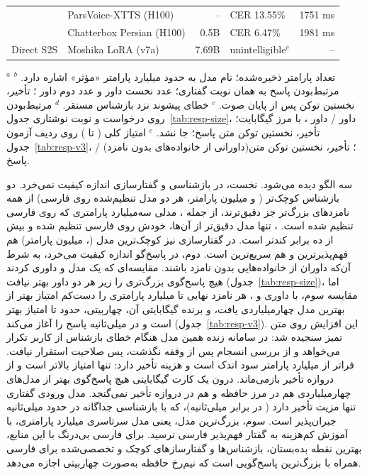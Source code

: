 \begin{table}[ht]
\begin{latin}
\begin{tabular}{llrlr}
 & ParsVoice-XTTS (H100) & -- & CER 13.55\% & 1751 ms \\
 & Chatterbox Persian (H100) & 0.5B & CER 6.47\% & 1981 ms \\
\midrule
Direct S2S & Moshika LoRA (v7a) & 7.69B & unintelligible$^{c}$ & -- \\
\bottomrule
\end{tabular}
\end{latin}
\par\smallskip\footnotesize
$^{a}$ تعداد پارامتر ذخیره‌شده؛ نام مدل به حدود  میلیارد پارامتر «مؤثر» اشاره دارد.
$^{b}$ مرتبط‌بودن پاسخ به همان  نوبت گفتاری؛ عدد نخست داور  و عدد دوم داور ؛ تأخیر، نخستین توکن پس از پایان صوت.
$^{c}$ خطای پیشوند  نزد بازشناس مستقر.
$^{d}$ مرتبط‌بودن روی  درخواست و نوبت نوشتاری جدول~\ref{tab:resp-size}، داور
 / داور ، با مرز  گیگابایت؛ تأخیر، نخستین توکن متن پاسخ؛
 جا نشد.
$^{e}$ امتیاز کلی ( تا ) روی  ردیف آزمون جدول~\ref{tab:resp-v3}،
 /  (داورانی از خانواده‌های بدون نامزد)؛ تأخیر، نخستین توکن متن پاسخ.
\end{table}

سه الگو دیده می‌شود. نخست، در بازشناسی و گفتارسازی اندازه کیفیت نمی‌خرد. دو بازشناس کوچک‌تر
( و  میلیون پارامتر، هر دو مدل  تنظیم‌شده روی فارسی) از همه
نامزدهای بزرگ‌تر جز  دقیق‌ترند، از جمله ، مدلی سه‌میلیارد
پارامتری که روی فارسی تنظیم شده است. ، تنها مدل دقیق‌تر از آن‌ها،
خودش روی فارسی تنظیم شده و بیش از ده برابر کندتر است. در گفتارسازی نیز کوچک‌ترین
مدل (،  میلیون پارامتر) هم فهم‌پذیرترین و هم سریع‌ترین است.
دوم، در پاسخ‌گو اندازه کیفیت می‌خرد، به شرط آن‌که داوران از خانواده‌هایی بدون نامزد
باشند. مقایسه‌ای که یک مدل  و  داوری کردند هیچ پاسخ‌گوی بزرگ‌تری
را زیر هر دو داور بهتر نیافت (جدول~\ref{tab:resp-size})، اما مقایسه سوم، با داوری
 و ، هر نامزد نهایی  تا  میلیارد پارامتری را
دست‌کم  امتیاز بهتر از بهترین مدل چهارمیلیاردی یافت، و برنده 
گیگابایتی آن،  چهاربیتی، حدود  تا  امتیاز بهتر است و
در  میلی‌ثانیه پاسخ را آغاز می‌کند (جدول~\ref{tab:resp-v3}). این افزایش روی
متن تمیز سنجیده شد: در سامانه زنده همین مدل هنگام خطای بازشناس از کاربر تکرار
می‌خواهد و از بررسی انسجام پس از وقفه نگذشت، پس صلاحیت استقرار نیافت. فراتر از 
میلیارد پارامتر سود اندک است و هزینه تأخیر دارد:  تنها 
امتیاز بالاتر است و از دروازه تأخیر بازمی‌ماند. درون یک کارت  گیگابایتی هیچ
پاسخ‌گوی بهتر از مدل‌های چهارمیلیاردی هم در مرز حافظه و هم در دروازه تأخیر نمی‌گنجد.
مدل ورودی گفتاری تنها مزیت تأخیر
دارد ( در برابر  میلی‌ثانیه)، که با بازشناسی جداگانه در حدود
 میلی‌ثانیه جبران‌پذیر است. سوم، بزرگ‌ترین مدل، یعنی مدل سرتاسری
 میلیارد پارامتری، با آموزش کم‌هزینه به گفتار فهم‌پذیر فارسی نرسید.
برای فارسی بی‌درنگ با این منابع، بهترین نقطه بده‌بستان، بازشناس‌ها و گفتارسازهای
کوچک و تخصصی‌شده برای فارسی همراه با بزرگ‌ترین پاسخ‌گویی است که نیم‌رخ حافظه به‌صورت
چهاربیتی اجازه می‌دهد.

